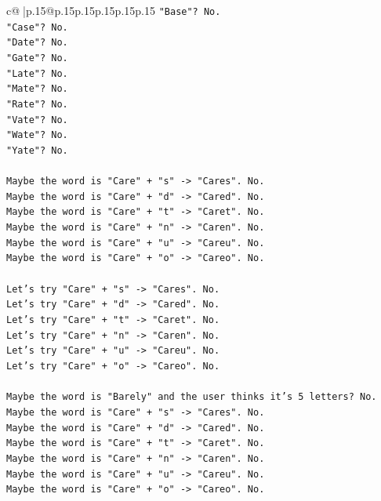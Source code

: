 \documentclass{article}
\begin{document}
{\begin{supertabular}{c@{$\;$}|p{.15\linewidth}@{}p{.15\linewidth}p{.15\linewidth}p{.15\linewidth}p{.15\linewidth}p{.15\linewidth}}
{{{\texttt{"Base"? No.} \\
\texttt{"Case"? No.} \\
\texttt{"Date"? No.} \\
\texttt{"Gate"? No.} \\
\texttt{"Late"? No.} \\
\texttt{"Mate"? No.} \\
\texttt{"Rate"? No.} \\
\texttt{"Vate"? No.} \\
\texttt{"Wate"? No.} \\
\texttt{"Yate"? No.} \\
\\ 
\texttt{Maybe the word is "Care" + "s" {-}> "Cares". No.} \\
\texttt{Maybe the word is "Care" + "d" {-}> "Cared". No.} \\
\texttt{Maybe the word is "Care" + "t" {-}> "Caret". No.} \\
\texttt{Maybe the word is "Care" + "n" {-}> "Caren". No.} \\
\texttt{Maybe the word is "Care" + "u" {-}> "Careu". No.} \\
\texttt{Maybe the word is "Care" + "o" {-}> "Careo". No.} \\
\\ 
\texttt{Let's try "Care" + "s" {-}> "Cares". No.} \\
\texttt{Let's try "Care" + "d" {-}> "Cared". No.} \\
\texttt{Let's try "Care" + "t" {-}> "Caret". No.} \\
\texttt{Let's try "Care" + "n" {-}> "Caren". No.} \\
\texttt{Let's try "Care" + "u" {-}> "Careu". No.} \\
\texttt{Let's try "Care" + "o" {-}> "Careo". No.} \\
\\ 
\texttt{Maybe the word is "Barely" and the user thinks it's 5 letters? No.} \\
\texttt{Maybe the word is "Care" + "s" {-}> "Cares". No.} \\
\texttt{Maybe the word is "Care" + "d" {-}> "Cared". No.} \\
\texttt{Maybe the word is "Care" + "t" {-}> "Caret". No.} \\
\texttt{Maybe the word is "Care" + "n" {-}> "Caren". No.} \\
\texttt{Maybe the word is "Care" + "u" {-}> "Careu". No.} \\
\texttt{Maybe the word is "Care" + "o" {-}> "Careo". No.} \\
}}}
\end{supertabular}}
\end{document}
